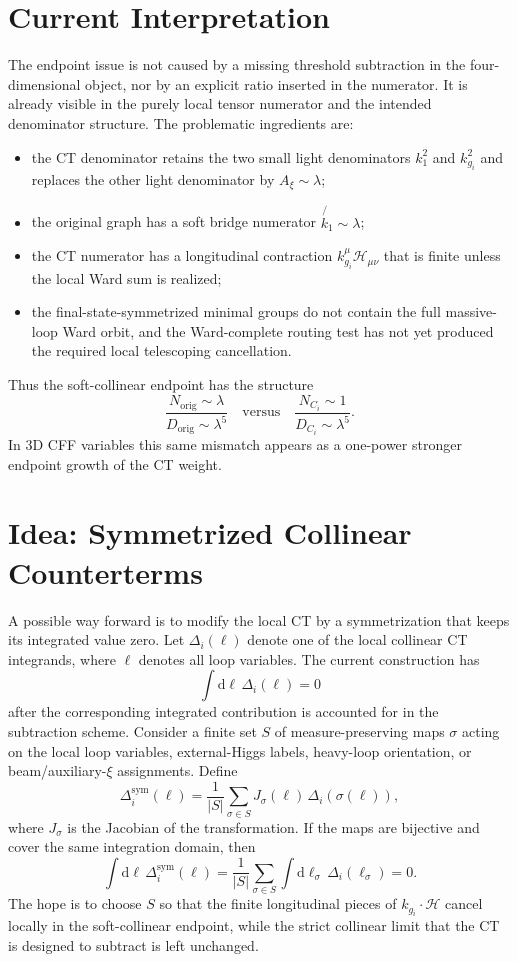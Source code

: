 \documentclass[11pt]{report}
\newcommand{\dd}{\mathrm{d}}
\newcommand{\slashp}[1]{\not{#1}}
\newcommand{\Axi}{A_\xi}
\newcommand{\Hamp}{\mathcal{H}}
\begin{document}
\chapter{Current Interpretation}

The endpoint issue is not caused by a missing threshold subtraction in the
four-dimensional object, nor by an explicit ratio inserted in the numerator.
It is already visible in the purely local tensor numerator and the intended
denominator structure. The problematic ingredients are:
\begin{itemize}
  \item the CT denominator retains the two small light denominators
  \(k_1^2\) and \(k_{g_i}^2\) and replaces the other light denominator by
  \(\Axi\sim \lambda\);
  \item the original graph has a soft bridge numerator
  \(\slashp{k_1}\sim\lambda\);
  \item the CT numerator has a longitudinal contraction
  \(k_{g_i}^{\mu}\Hamp_{\mu\nu}\) that is finite unless the local Ward sum is
  realized;
  \item the final-state-symmetrized minimal groups do not contain the full
  massive-loop Ward orbit, and the Ward-complete routing test has not yet
  produced the required local telescoping cancellation.
\end{itemize}

Thus the soft-collinear endpoint has the structure
\[
  \frac{N_{\mathrm{orig}}\sim\lambda}
       {D_{\mathrm{orig}}\sim\lambda^5}
  \quad\text{versus}\quad
  \frac{N_{C_i}\sim 1}
       {D_{C_i}\sim\lambda^5}.
\]
In 3D CFF variables this same mismatch appears as a one-power stronger
endpoint growth of the CT weight.

\chapter{Idea: Symmetrized Collinear Counterterms}

A possible way forward is to modify the local CT by a symmetrization that
keeps its integrated value zero. Let \(\Delta_i(\ell)\) denote one of the
local collinear CT integrands, where \(\ell\) denotes all loop variables. The
current construction has
\[
  \int \dd\ell\, \Delta_i(\ell)=0
\]
after the corresponding integrated contribution is accounted for in the
subtraction scheme. Consider a finite set \(S\) of measure-preserving maps
\(\sigma\) acting on the local loop variables, external-Higgs labels,
heavy-loop orientation, or beam/auxiliary-\(\xi\) assignments. Define
\[
  \Delta_i^{\mathrm{sym}}(\ell)
  =
  \frac{1}{|S|}
  \sum_{\sigma\in S}
  J_\sigma(\ell)\,
  \Delta_i\!\left(\sigma(\ell)\right),
  \label{eq:sym-ct}
\]
where \(J_\sigma\) is the Jacobian of the transformation. If the maps are
bijective and cover the same integration domain, then
\[
  \int \dd\ell\,\Delta_i^{\mathrm{sym}}(\ell)
  =
  \frac{1}{|S|}
  \sum_{\sigma\in S}
  \int \dd\ell_\sigma\,\Delta_i(\ell_\sigma)
  =
  0.
  \label{eq:sym-zero}
\]
The hope is to choose \(S\) so that the finite longitudinal pieces of
\(k_{g_i}\cdot\Hamp\) cancel locally in the soft-collinear endpoint, while the
strict collinear limit that the CT is designed to subtract is left unchanged.
\end{document}
